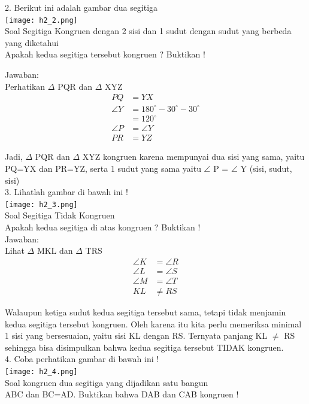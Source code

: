 \documentclass[11pt,fleqn]{book} %
\begin{document}
2. Berikut ini adalah gambar dua segitiga\\
\texttt{[image: h2\_2.png]}\\
Soal Segitiga Kongruen dengan 2 sisi dan 1 sudut dengan sudut yang berbeda yang diketahui\\
Apakah kedua segitiga tersebut kongruen ? Buktikan !

Jawaban:\\
Perhatikan $\Delta$ PQR dan $\Delta$ XYZ\\
    \begin{align*} PQ &= YX \\ \angle Y &= 180^{\circ} - 30^{\circ} - 30^{\circ} \\ &= 120^{\circ} \\ \angle P &= \angle Y \\ PR &= YZ \end{align*}

Jadi, $\Delta$ PQR dan $\Delta$ XYZ kongruen karena mempunyai dua sisi yang sama, yaitu PQ=YX dan PR=YZ, serta 1 sudut yang sama yaitu $\angle$ P = $\angle$ Y (sisi, sudut, sisi)\\


3. Lihatlah gambar di bawah ini !\\
\texttt{[image: h2\_3.png]}\\
Soal Segitiga Tidak Kongruen\\
Apakah kedua segitiga di atas kongruen ? Buktikan !\\

Jawaban:\\
Lihat $\Delta$ MKL dan $\Delta$ TRS\\
    \begin{align*} \angle K &= \angle R \\ \angle L &= \angle S \\ \angle M &= \angle T \\ KL &\neq RS \end{align*}

Walaupun ketiga sudut kedua segitiga tersebut sama, tetapi tidak menjamin kedua segitiga tersebut kongruen. Oleh karena itu kita perlu memeriksa minimal 1 sisi yang bersesuaian, yaitu sisi KL dengan RS. Ternyata panjang KL $\neq$ RS sehingga bisa disimpulkan bahwa kedua segitiga tersebut TIDAK kongruen.\\


4. Coba perhatikan gambar di bawah ini !\\
\texttt{[image: h2\_4.png]}\\
Soal kongruen dua segitiga yang dijadikan satu bangun\\
ABC dan BC=AD. Buktikan bahwa DAB dan CAB kongruen !\\
\end{document}
